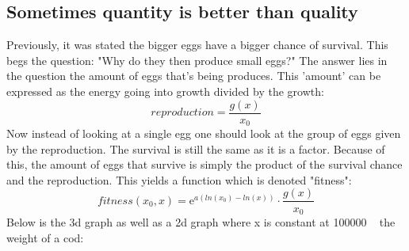 \documentclass{article}
\numberwithin{equation}{section} %
\newcommand{\me}{\mathrm{e}}
\begin{document}
\subsection{Sometimes quantity is better than quality}\label{sec:Ex5A}
Previously,  it was stated the bigger eggs have a bigger chance of survival. This begs the question: "Why do they then produce small eggs?" The answer lies in the question the amount of eggs that's being produces. This 'amount' can be expressed as the energy going into growth divided by the growth:
\begin{equation}
    reproduction = \dfrac{g(x)}{x_0}
\end{equation}
Now instead of looking at a single egg one should look at the group of eggs given by the reproduction. The survival is still the same as it is a factor. Because of this, the amount of eggs that survive is simply the product of the survival chance and the reproduction. This yields a function which is denoted "fitness":
\begin{equation}\label{eq:fitness}
    fitness(x_0,x) = \me^{a(ln(x_0)-ln(x))}\cdot\dfrac{g(x)}{x_0}
\end{equation}
 Below is the 3d graph as well as a 2d graph where x is constant at 100000 ~ the weight of a cod:
\end{document}
